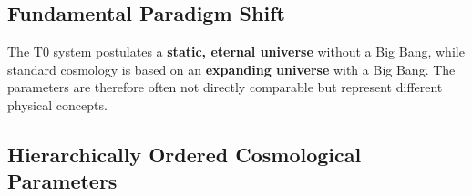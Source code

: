 \documentclass[12pt,a4paper]{report}
\begin{document}
\subsection{Fundamental Paradigm Shift}
\label{subsec:paradigm_shift}

\begin{tcolorbox}[colback=red!5!white,colframe=red!75!black,title=Warning: Fundamental Differences]
	The T0 system postulates a \textbf{static, eternal universe} without a Big Bang, while standard cosmology is based on an \textbf{expanding universe} with a Big Bang. The parameters are therefore often not directly comparable but represent different physical concepts.
\end{tcolorbox}

\subsection{Hierarchically Ordered Cosmological Parameters}
\label{subsec:cosmic_hierarchical_mapping}
\end{document}
